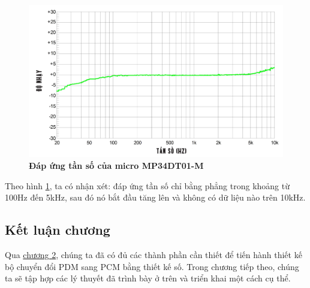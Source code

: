 \begin{figure}[H]
    \centering
    \includegraphics[width=13cm]{Images/Chuong2/do_nhay.png}
    \caption[Đáp ứng tần số của micro MP34DT01-M]{\bfseries \fontsize{12pt}{0pt}\selectfont Đáp ứng tần số của micro MP34DT01-M}
    \label{do_nhay}
\end{figure}
Theo hình \ref{do_nhay}, ta có nhận xét: đáp ứng tần số chỉ bằng phẳng trong khoảng từ 100Hz đến 5kHz, sau đó nó bắt đầu tăng lên và không có dữ liệu nào trên 10kHz.
\subsection{Kết luận chương}
Qua \hyperref[chuong2]{chương 2}, chúng ta đã có đủ các thành phần cần thiết để tiến hành thiết kế bộ chuyển đổi PDM sang PCM bằng thiết kế số. Trong chương tiếp theo, chúng ta sẽ tập hợp các lý thuyết đã trình bày ở trên và triển khai một cách cụ thể.
\newpage